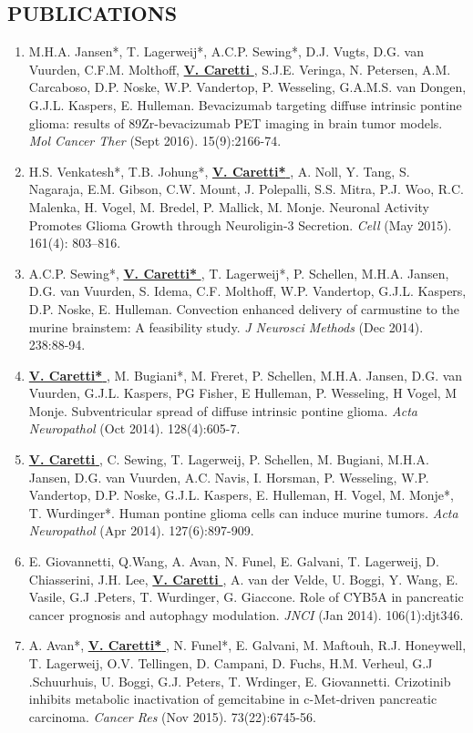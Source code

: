 \documentclass[line,margin]{res}
\newcommand{\namestyle}[1]{\underline{\bf #1 }}
\begin{document}
\begin{resume}
\section{PUBLICATIONS}
\vspace{-0.75pt}
{\footnotesize
\begin{enumerate}
\item M.H.A. Jansen*, T. Lagerweij*, A.C.P. Sewing*, D.J. Vugts, D.G. van Vuurden, C.F.M. Molthoff, \namestyle{V. Caretti}, S.J.E. Veringa, N. Petersen, A.M. Carcaboso, D.P. Noske, W.P. Vandertop, P. Wesseling, G.A.M.S. van Dongen, G.J.L. Kaspers, E. Hulleman. Bevacizumab targeting diffuse intrinsic pontine glioma: results of 89Zr-bevacizumab PET imaging in brain tumor models. \emph{Mol Cancer Ther} (Sept 2016). 15(9):2166-74.
\item H.S. Venkatesh*, T.B. Johung*, \namestyle{V. Caretti*}, A. Noll, Y. Tang, S. Nagaraja, E.M. Gibson, C.W. Mount, J. Polepalli, S.S. Mitra, P.J. Woo, R.C. Malenka, H. Vogel, M. Bredel, P. Mallick, M. Monje. Neuronal Activity Promotes Glioma Growth through Neuroligin-3 Secretion. \emph{Cell} (May 2015). 161(4): 803–816.
\item A.C.P. Sewing*, \namestyle{V. Caretti*}, T. Lagerweij*, P. Schellen, M.H.A. Jansen, D.G. van Vuurden, S. Idema, C.F. Molthoff, W.P. Vandertop, G.J.L. Kaspers, D.P. Noske, E. Hulleman. Convection enhanced delivery of carmustine to the murine brainstem: A feasibility study. \emph{J Neurosci Methods} (Dec 2014). 238:88-94.
\item \namestyle{V. Caretti*}, M. Bugiani*, M. Freret, P. Schellen, M.H.A. Jansen, D.G. van Vuurden, G.J.L. Kaspers, PG Fisher, E Hulleman, P. Wesseling, H Vogel, M Monje. Subventricular spread of diffuse intrinsic pontine glioma. \emph{Acta Neuropathol} (Oct 2014). 128(4):605-7.
\item \namestyle{V. Caretti}, C. Sewing, T. Lagerweij, P. Schellen, M. Bugiani, M.H.A. Jansen, D.G. van Vuurden, A.C. Navis, I. Horsman, P. Wesseling, W.P. Vandertop, D.P. Noske, G.J.L. Kaspers, E. Hulleman, H. Vogel, M. Monje*, T. Wurdinger*. Human pontine glioma cells can induce murine tumors. \emph{Acta Neuropathol} (Apr 2014). 127(6):897-909.
\item E. Giovannetti, Q.Wang, A. Avan, N. Funel, E. Galvani, T. Lagerweij, D. Chiasserini, J.H. Lee, \namestyle{V. Caretti}, A. van der Velde, U. Boggi, Y. Wang, E. Vasile, G.J .Peters, T. Wurdinger, G. Giaccone. Role of CYB5A in pancreatic cancer prognosis and autophagy modulation. \emph{JNCI} (Jan 2014). 106(1):djt346.
\item A. Avan*, \namestyle{V. Caretti*}, N. Funel*, E. Galvani, M. Maftouh, R.J. Honeywell, T. Lagerweij, O.V. Tellingen, D. Campani, D. Fuchs, H.M. Verheul, G.J .Schuurhuis, U. Boggi, G.J. Peters, T. Wrdinger, E. Giovannetti. Crizotinib inhibits metabolic inactivation of gemcitabine in c-Met-driven pancreatic carcinoma. \emph{Cancer Res} (Nov 2015). 73(22):6745-56.

\end{enumerate}}
\end{resume}
\end{document}
